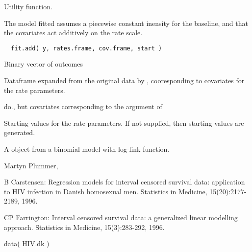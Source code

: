 \begin{Description}\relax
Utility function.

The model fitted assumes a piecewise constant inensity for the
baseline, and that the covariates act additively on the rate scale.
\end{Description}
\begin{Usage}
\begin{verbatim}
  fit.add( y, rates.frame, cov.frame, start )
  \end{verbatim}
\end{Usage}
\begin{Arguments}
\begin{ldescription}
\item[\code{y}] Binary vector of outcomes
\item[\code{rates.frame}] Dataframe expanded from the original data by
, cooresponding to covariates for the rate
parameters.
\item[\code{cov.frame}] do., but covariates corresponding to the
 argument of 
\item[\code{start}] Starting values for the rate parameters. If not supplied,
then starting values are generated.
\end{ldescription}
\end{Arguments}
\begin{Value}
A  object from a binomial model with log-link function.
\end{Value}
\begin{Author}\relax
Martyn Plummer, 
\end{Author}
\begin{References}\relax
B Carstensen: Regression models for interval censored
survival data: application to HIV infection in Danish homosexual
men. Statistics in Medicine, 15(20):2177-2189, 1996.

CP Farrington: Interval censored survival data: a generalized linear
modelling approach. Statistics in Medicine, 15(3):283-292, 1996.
\end{References}
\begin{SeeAlso}\relax
{}
\end{SeeAlso}
\begin{Examples}
\begin{ExampleCode}
  data( HIV.dk ) 
  \end{ExampleCode}
\end{Examples}

